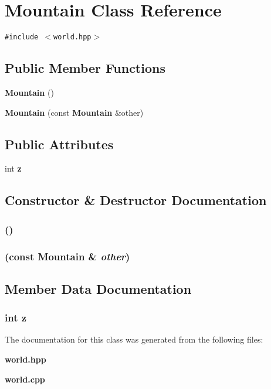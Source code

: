 \section{Mountain Class Reference}
\label{classMountain}
{\tt \#include $<$world.hpp$>$}

\subsection*{Public Member Functions}
\begin{CompactItemize}
\item 
{\bf Mountain} ()
\item 
{\bf Mountain} (const {\bf Mountain} \&other)
\end{CompactItemize}
\subsection*{Public Attributes}
\begin{CompactItemize}
\item 
int {\bf z}
\end{CompactItemize}


\subsection{Constructor \& Destructor Documentation}
\subsubsection{ ()}\label{classMountain_a0}


\subsubsection{ (const {\bf Mountain} \& {\em other})}\label{classMountain_a1}




\subsection{Member Data Documentation}
\subsubsection{\setlength{\rightskip}{0pt plus 5cm}int {\bf z}}\label{classMountain_o0}




The documentation for this class was generated from the following files:\begin{CompactItemize}
\item 
{\bf world.hpp}\item 
{\bf world.cpp}\end{CompactItemize}

